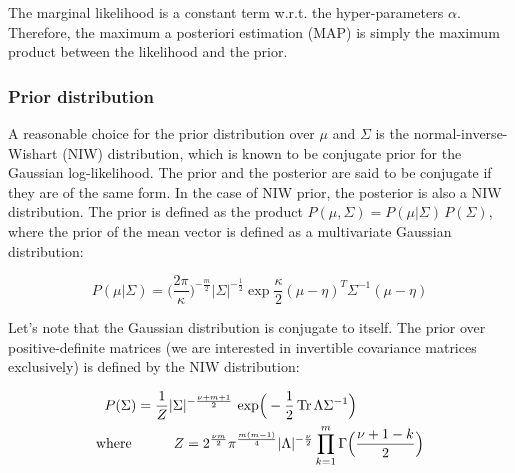             The marginal likelihood is a constant term w.r.t. the hyper-parameters $\alpha$. Therefore, the maximum  %
            a posteriori estimation (MAP) is simply the maximum product between the likelihood and the prior.

        \subsubsection{Prior distribution}

            A reasonable choice for the prior distribution over $\mu$ and $\Sigma$ is the normal-inverse-Wishart (NIW)
            distribution, which is known to be conjugate prior for the Gaussian log-likelihood.
            The prior and the posterior are said to be conjugate if they are of the same form. In the case of NIW prior,
            the posterior is also a NIW distribution. The prior is defined as the product
            $P(\mu, \Sigma) = P(\mu \vert \Sigma)\,P(\Sigma)$, where the prior of the mean vector is defined as a multivariate
            Gaussian distribution:

            \begin{equation}  %
                P(\mu \vert \Sigma) = \Big(\frac{2 \pi}{\kappa}\Big)^{-\frac{m}{2}} \vert\Sigma\vert^{-\frac{1}{2}}
                \exp{\frac{\kappa}{2} (\mu - \eta)^T \Sigma^{-1} (\mu - \eta)}
            \end{equation}

            Let's note that the Gaussian distribution is conjugate to itself. The prior over positive-definite matrices
            (we are interested in invertible covariance matrices exclusively) is defined by the NIW distribution:

            \begin{equation}  %
                \begin{split}  %
                    P(\Sigma) & = \frac{1}{Z} \vert\Sigma\vert^{-\frac{\nu + m + 1}{2}} \exp{-\frac{1}{2} \trace{\Lambda \Sigma^{-1}}} \\
                    \text{where } & \ \ \ \ \ \ \ \ Z = 2^{\frac {\nu m}{2}} \pi^{\frac{m (m - 1)}{4}} \vert\Lambda\vert^{-\frac \nu2}
                    \prod\limits_{k=1}^{m} \Gamma\Big(\frac{\nu + 1 - k}{2}\Big)
                \end{split}
            \end{equation}

